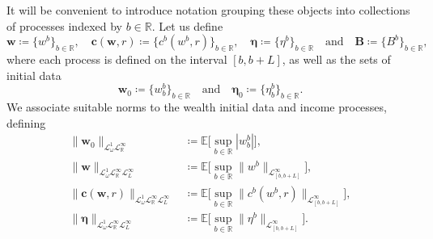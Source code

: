 \documentclass[11pt,oneside,english,reqno,dvipsnames,table]{amsart}
\numberwithin{equation}{section}
\theoremstyle{plain}
\theoremstyle{definition}
\theoremstyle{remark}
\newtheorem{rem}[thm]{\protect\remarkname}
\theoremstyle{plain}
\theoremstyle{plain}
\theoremstyle{plain}
\theoremstyle{plain}
\theoremstyle{plain}
\theoremstyle{plain}
\theoremstyle{plain}
\providecommand{\remarkname}{Remark}
\providecommand{\remarkname}{Remark}
\newcommand{\bB}{\mathbf{B}}
\newcommand{\bc}{\mathbf{c}}
\newcommand{\bw}{\mathbf{w}}
\newcommand{\mbE}{\mathbb{E}}
\newcommand{\mbR}{\mathbb{R}}
\newcommand{\msL}{\mathscr{L}}
\newcommand{\bmeta}{\boldsymbol{\eta}}
\numberwithin{thm}{section}
\begin{document}
It will be convenient to introduce notation grouping these objects into collections of processes indexed by $b\in \mbR$. Let us define
%
\begin{equation*}
    \bw \coloneqq \{w^b\}_{b\in \mbR},\quad \bc(\bw,r) \coloneqq \{c^b(w^b,r)\}_{b\in \mbR}, \quad \bmeta\coloneqq \{\eta^b\}_{b\in \mbR}\quad \text{and}\quad \bB \coloneqq \{B^b\}_{b\in \mbR},
\end{equation*}
%
where each process is defined on the interval $[b,b+L]$, as well as the sets of initial data
%
\begin{equation*}
    \bw_0 \coloneqq \{w^b_b\}_{b\in \mbR}\quad \text{and}\quad \bmeta_0 \coloneqq \{\eta^b_b\}_{b\in \mbR}.
\end{equation*}
%
We associate suitable norms to the wealth initial data and income processes, defining
%
\begin{align}
    \|\bw_0\|_{\msL^1_\omega\msL^\infty_{\mbR}} &\, \coloneqq  \mbE\Big[\sup_{b\in \mbR}|w^b_b|\Big], \label{eq:w_0_norm}\\
    \|\bw\|_{\msL^1_\omega\msL^\infty_{\mbR} \msL^\infty_{L}} &\, \coloneqq  \mbE\Big[\sup_{b\in \mbR}\|w^b\|_{\msL^\infty_{[b,b+L]}}\Big], \label{eq:wealth_norm}\\
     \|\bc(\bw,r)\|_{\msL^1_\omega\msL^\infty_{\mbR} \msL^\infty_{L}} &\, \coloneqq  \mbE\Big[\sup_{b\in \mbR}\|c^b(w^b,r)\|_{\msL^\infty_{[b,b+L]}}\Big], \label{eq:consumption_norm}\\
    \|\bmeta\|_{\msL^1_\omega\msL^\infty_{\mbR} \msL^\infty_{L}} &\, \coloneqq  \mbE\Big[\sup_{b\in \mbR}\|\eta^b\|_{\msL^\infty_{[b,b+L]}}\Big]. \label{eq:income_norm}
\end{align}
%
%
\end{document}

